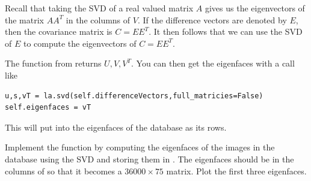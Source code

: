 Recall that taking the SVD of a real valued matrix $A$ gives us the eigenvectors of the matrix $AA^T$ in the columns of $V$.
If the difference vectors are denoted by $E$, then the covariance matrix is $C = EE^T$.
It then follows that we can use the SVD of $E$ to compute the eigenvectors of $C = EE^T$.

The  function from  returns $U,V,V^T$. You can then get the eigenfaces with a call like
\begin{lstlisting}
u,s,vT = la.svd(self.differenceVectors,full_matricies=False)
self.eigenfaces = vT
\end{lstlisting}
This will put into  the eigenfaces of the database as its rows.

\begin{problem}
Implement the function  by computing the eigenfaces of the images in the database using the SVD and storing them in .
The eigenfaces should be in the columns of  so that it becomes a $36000 \times 75$ matrix.
Plot the first three eigenfaces.
\end{problem}

